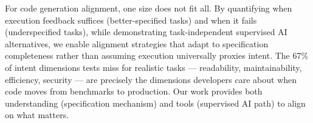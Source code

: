 For code generation alignment, one size does not fit all. By quantifying when execution feedback suffices (better-specified tasks) and when it fails (underspecified tasks), while demonstrating task-independent supervised AI alternatives, we enable alignment strategies that adapt to specification completeness rather than assuming execution universally proxies intent. The 67\% of intent dimensions tests miss for realistic tasks --- readability, maintainability, efficiency, security --- are precisely the dimensions developers care about when code moves from benchmarks to production. Our work provides both understanding (specification mechanism) and tools (supervised AI path) to align on what matters.
